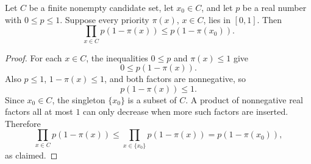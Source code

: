 \begin{helper}
Let \(C\) be a finite nonempty candidate set, let \(x_0\in C\), and let
\(p\) be a real number with \(0\le p\le 1\).  Suppose every priority
\(\pi(x)\), \(x\in C\), lies in \([0,1]\).  Then
\[
\prod_{x\in C} p(1-\pi(x)) \le p(1-\pi(x_0)).
\]
\end{helper}
\begin{proof}
For each \(x\in C\), the inequalities \(0\le p\) and \(\pi(x)\le 1\) give
\[
0\le p(1-\pi(x)).
\]
Also \(p\le 1\), \(1-\pi(x)\le 1\), and both factors are nonnegative, so
\[
p(1-\pi(x))\le 1.
\]
Since \(x_0\in C\), the singleton \(\{x_0\}\) is a subset of \(C\).  A product
of nonnegative real factors all at most \(1\) can only decrease when more
such factors are inserted.  Therefore
\[
\prod_{x\in C}p(1-\pi(x))
\le
\prod_{x\in \{x_0\}}p(1-\pi(x))
=p(1-\pi(x_0)),
\]
as claimed.
\end{proof}

